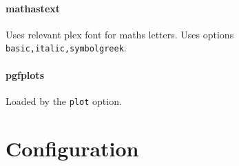 \documentclass[solid,math,chem,code,plot]{bmc}
\begin{document}
\paragraph{\ttfamily mathastext}\label{par:mathastext}
Uses relevant plex font for maths letters.
Uses options \texttt{basic,italic,symbolgreek}.

\paragraph{\ttfamily pgfplots}\label{par:pgfplots}
Loaded by the \texttt{plot} option.

\section{Configuration}
\end{document}
